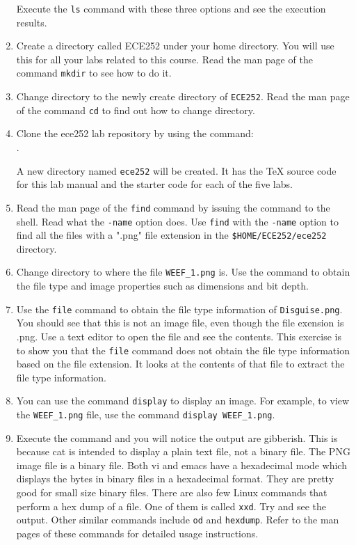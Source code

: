 \begin{enumerate}
      Execute  the \verb+ls+ command with these three options and see the execution results.
    \item Create a directory called ECE252 under your home directory. You will use this for all your labs related to this course.
          Read the man page of the command \verb+mkdir+ to see how to do it.
    \item Change directory to the newly create directory of \verb+ECE252+.
          Read the man page of the command \verb+cd+ to find out how to change directory.
    \item Clone the ece252 lab repository by using the command: \\
      .

      A new directory named \verb+ece252+ will be created. It has the TeX source code for this lab manual and the starter code for each of the five labs. 
    \item Read the man page of the \verb+find+ command by issuing the
       command to the shell. Read what the \verb+-name+ option does. Use \verb+find+ with the \verb+-name+ option to find all the files with a ".png" file extension in the \verb+$HOME/ECE252/ece252+ directory.
    \item Change directory to where the file \verb+WEEF_1.png+ is. Use the command  to obtain the file type and image properties such as dimensions and bit depth.
    \item Use the \verb+file+ command to obtain the file type information of \verb+Disguise.png+. You should see that this is not an image file, even though the file exension is .png.  Use a text editor to open the file and see the contents. This exercise is to show you that the \verb+file+ command does not obtain the file type information based on the file extension. It looks at the contents of that file to extract the file type information.
    \item You can use the command \verb+display+ to display an image. For example, to view the \verb+WEEF_1.png+ file, use the command \verb+display WEEF_1.png+. 
    \item Execute the  command and you will notice the output are gibberish. This is because cat is intended to display a plain text file, not a binary file. The PNG image file is a binary file. Both vi and emacs have a hexadecimal mode which displays the bytes in binary files in a hexadecimal format. They are pretty good for small size binary files. There are also few Linux commands that perform a hex dump of a file. One of them is called \verb+xxd+. Try  and see the output. Other similar commands include \verb+od+ and \verb+hexdump+. Refer to the man pages of these commands for detailed usage instructions. 

\end{enumerate}
